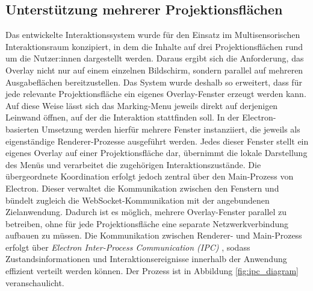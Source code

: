 \subsection{Unterstützung mehrerer Projektionsflächen}

Das entwickelte Interaktionssystem wurde für den Einsatz im Multisensorischen Interaktionsraum konzipiert, in dem die Inhalte auf drei Projektionsflächen rund um die Nutzer:innen dargestellt werden.
Daraus ergibt sich die Anforderung, das Overlay nicht nur auf einem einzelnen Bildschirm, sondern parallel auf mehreren Ausgabeflächen bereitzustellen.
Das System wurde deshalb so erweitert, dass für jede relevante Projektionsfläche ein eigenes Overlay-Fenster erzeugt werden kann.
Auf diese Weise lässt sich das Marking-Menu jeweils direkt auf derjenigen Leinwand öffnen, auf der die Interaktion stattfinden soll.
In der Electron-basierten Umsetzung werden hierfür mehrere Fenster instanziiert, die jeweils als eigenständige Renderer-Prozesse ausgeführt werden.
Jedes dieser Fenster stellt ein eigenes Overlay auf einer Projektionsfläche dar, übernimmt die lokale Darstellung des Menüs und verarbeitet die zugehörigen Interaktions\-zustände.
Die übergeordnete Koordination erfolgt jedoch zentral über den Main-Prozess von Electron.
Dieser verwaltet die Kommunikation zwischen den Fenstern und bündelt zugleich die WebSocket-Kommunikation mit der angebundenen Zielanwendung.
Dadurch ist es möglich, mehrere Overlay-Fenster parallel zu betreiben, ohne für jede Projektionsfläche eine separate Netzwerkverbindung aufbauen zu müssen.
Die Kommunikation zwischen Renderer- und Main-Prozess erfolgt über \textit{Electron Inter-Process Communication (IPC)} \parencite{electronIPCdocumentation}, sodass Zustandsinformationen und Interaktionsereignisse innerhalb der Anwendung effizient verteilt werden können. Der Prozess ist in Abbildung \ref{fig:ipc_diagram} veranschaulicht.

